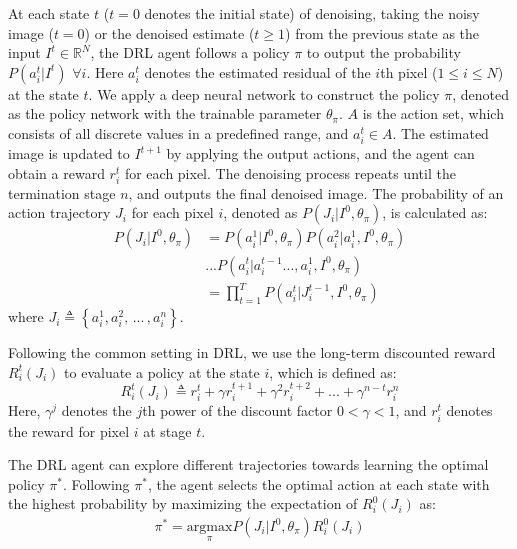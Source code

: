 \documentclass{article}
\begin{document}
At each state $t$ ($t = 0$ denotes the initial state) of denoising, taking the noisy image ($t = 0$) or the denoised estimate ($t \geq 1$) from the previous state as the input $I^t \in \mathbb{R}^N$, the DRL agent follows a policy $\pi$ to output the probability $P(a_i^t|I^t)$ $\forall i$. 
Here $a_i^t$ denotes the estimated residual of the $i$th pixel ($1 \leq i \leq N$) at the state $t$. 
We apply a deep neural network to construct the policy $\pi$, denoted as the policy network with the trainable parameter $\theta_\pi$. 
$A$ is the action set, which consists of all discrete values in a predefined range, and $a_i^t \in A$. 
The estimated image is updated to $I^{t+1}$ by applying the output actions, and the agent can obtain a reward $r_i^t$ for each pixel. The denoising process repeats until the termination stage $n$, and outputs the final denoised image. The probability of an action trajectory $J_i$ for each pixel $i$, denoted as $P(J_i|I^0,\theta_\pi)$, is calculated as:
\begin{equation}
\begin{aligned}
   P(J_i|I^0,\theta_\pi) &= P(a_i^1|I^0,\theta_\pi)P(a_i^2|a_i^1,I^0,\theta_\pi)\\
    &...P(a_i^t|a_i^{t-1}...,a_i^1,I^0,\theta_\pi)\\
&=\prod_{t=1}^T P(a_i^t|J_i^{t-1},I^0,\theta_\pi)
\end{aligned}
\end{equation}
where $J_i \triangleq \left \{ a_i^1, a_i^2,\, ... \,, a_i^n \right \}$.

Following the common setting in DRL, we use the long-term discounted reward $R_i^t(J_i)$ to evaluate a policy at the state $i$, which is defined as: 
\begin{equation}
    R_i^t(J_i) \triangleq r_i^t+\gamma r_i^{t+1}+\gamma^2 r_i^{t+2}+ ... +\gamma^{n-t} r_i^{n}
\end{equation}
Here, $\gamma^j$ denotes the $j$th power of the discount factor $0 < \gamma < 1$, and $r_i^t$ denotes the reward for pixel $i$ at stage $t$.

The DRL agent can explore different trajectories towards learning the optimal policy $\pi^*$. Following $\pi^*$, the agent selects the optimal action at each state with the highest probability by maximizing the expectation of $R_i^0(J_i)$ as:
\begin{equation}
\begin{aligned}
     \pi^* = \underset{\pi}{\mathrm{argmax}}P(J_i|I^0,\theta_\pi)R_i^0(J_i)
\end{aligned}
\end{equation}
\end{document}
